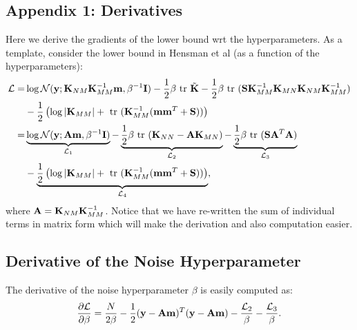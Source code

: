 \subsection{Appendix 1: Derivatives}
Here we derive the gradients of the lower bound wrt the  hyperparameters.
As a template, consider the lower bound in Hensman et al (as a function of the hyperparameters):
\begin{align}
\nonumber
\mathcal{L}
=& \log \mathcal{N}(\mathbf{y}; \mathbf{K}_{NM} \mathbf{K}_{MM}^{-1} \mathbf{m}, \beta^{-1}\mathbf{I})
 - \frac{1}{2} \beta \mbox{ \rm tr } \tilde{\mathbf{K}}
 - \frac{1}{2} \beta \mbox{ \rm tr } (\mathbf{S}\mathbf{K}_{MM}^{-1} \mathbf{K}_{MN} \mathbf{K}_{NM} \mathbf{K}_{MM}^{-1}) \\  \nonumber
&- \frac{1}{2} \left( \log |\mathbf{K}_{MM}| + \mbox{ \rm tr }(\mathbf{K}_{MM}^{-1}(\mathbf{m} \mathbf{m}^T + \mathbf{S})) \right) \\ \nonumber
=& \underbrace{\log \mathcal{N}(\mathbf{y}; \mathbf{A} \mathbf{m}, \beta^{-1}\mathbf{I})}_{\mathcal{L}_1}
 - \underbrace{\frac{1}{2} \beta \mbox{ \rm tr } (\mathbf{K}_{NN} - \mathbf{A}\mathbf{K}_{MN})}_{\mathcal{L}_2}
 - \underbrace{\frac{1}{2} \beta \mbox{ \rm tr } (\mathbf{S}\mathbf{A}^T\mathbf{A})}_{\mathcal{L}_3} \\  
&- \underbrace{\frac{1}{2} \left( \log |\mathbf{K}_{MM}| + \mbox{ \rm tr }(\mathbf{K}_{MM}^{-1}(\mathbf{m} \mathbf{m}^T + \mathbf{S})) \right)}_{\mathcal{L}_4},
\end{align}
where $\mathbf{A} = \mathbf{K}_{NM} \mathbf{K}_{MM}^{-1}$.
Notice that we have re-written the sum of individual terms in matrix form which will make the derivation and also computation easier.

\subsection{Derivative of the Noise Hyperparameter}
The derivative of the noise hyperparameter $\beta$ is easily computed as:
\begin{align}
\frac{\partial{\mathcal{L}}}{\partial{\beta}} = \frac{N}{2\beta} - \frac{1}{2} (\mathbf{y} - \mathbf{A}\mathbf{m})^T (\mathbf{y} - \mathbf{A}\mathbf{m}) - \frac{\mathcal{L}_2}{\beta} - \frac{\mathcal{L}_3}{\beta}.
\end{align}
